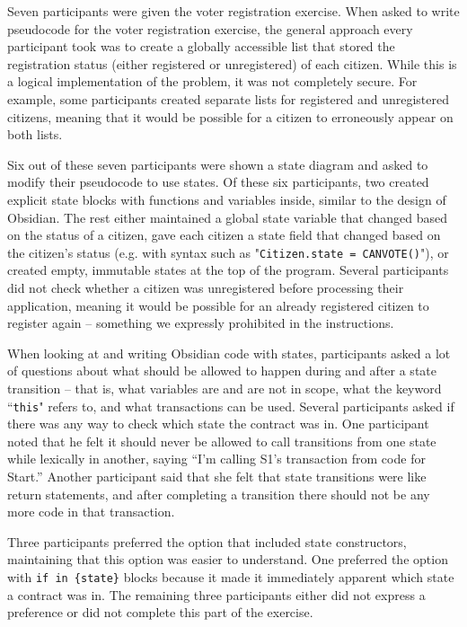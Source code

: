\documentclass[sigplan,10pt,review]{acmart}\settopmatter{printfolios=true}
\begin{document}
Seven participants were given the voter registration exercise. When asked to write pseudocode for the voter registration exercise, the 
general approach every participant took was to create a globally accessible list that stored the registration status (either registered or 
unregistered) of each citizen. While this is a logical implementation of the problem, it was not completely secure. For example, some 
participants created separate lists for registered and unregistered citizens, meaning that it would be possible for a citizen to erroneously 
appear on both lists. 
 	
Six out of these seven participants were shown a state diagram and asked to modify their pseudocode to use states. Of these six 
participants, two created explicit state blocks with functions and variables inside, similar to the design of Obsidian. The rest either maintained a global state variable that 
changed based on the status of a citizen, gave each citizen a state field that changed based on the citizen's status (e.g. with syntax such as 
"\texttt{\small{Citizen.state = CANVOTE()}}"), or created empty, immutable states at the top of the program. Several participants did not check whether a 
citizen was unregistered before processing their application, meaning it would be possible for an already registered citizen to register again 
-- something we expressly prohibited in the instructions. 
	
When looking at and writing Obsidian code with states, participants asked a lot of questions about what should be allowed to happen 
during and after a state transition -- that is, what variables are and are not in scope, what the keyword ``\texttt{\small{this}}" refers to, and what transactions 
can be used. Several participants asked if there was any way to check which state the contract was in. One participant noted that he felt it 
should never be allowed to call transitions from one state while lexically in another, saying ``I'm calling S1's transaction from code for Start.''
Another participant said that she felt that state transitions were like return statements, and after completing a transition there should not be 
any more code in that transaction.

Three participants preferred the option that included state constructors, maintaining that this option was easier to understand. One preferred the option with \texttt{\small{if in \{state\}}} blocks because it made it immediately apparent which state a contract was in. The remaining three participants either did not express a preference or did not complete this part of the exercise. 
\end{document}

